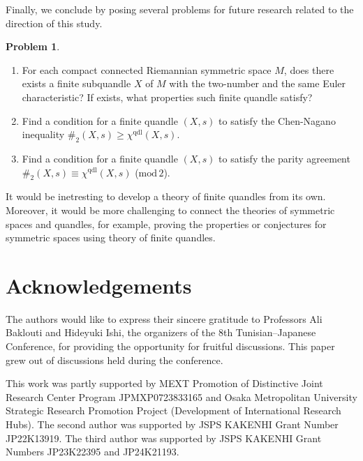 \documentclass[12pt]{amsart}
\theoremstyle{definition}
\newtheorem{Problem}[Prop]{Problem}
\begin{document}
Finally, we conclude by posing several problems for future research related to the direction of this study.

\begin{Problem} \noindent 
\begin{enumerate} 
\item 
For each compact connected Riemannian symmetric space $M$, 
does there exists a finite subquandle $X$ of $M$ with the two-number and the same Euler characteristic? 
If exists, what properties such finite quandle satisfy? 
\item 
Find a condition for a finite quandle $(X,s)$ to satisfy the Chen-Nagano inequality 
$\#_2 (X,s) \geq \chi^{\mathrm{qdl}} (X,s)$. 
\item
Find a condition for a finite quandle $(X,s)$ to satisfy the parity agreement 
$\#_2 (X,s) \equiv \chi^{\mathrm{qdl}} (X,s)$ ($\mathrm{mod}\, 2$). 
\end{enumerate} 
\end{Problem} 



It would be inetresting to develop a theory of finite quandles from its own. 
Moreover, it would be more challenging to connect the theories of symmetric spaces and quandles, 
for example, proving the properties or conjectures for symmetric spaces using theory of finite quandles. 

\section*{Acknowledgements}

The authors would like to express their sincere gratitude to Professors Ali Baklouti 
and Hideyuki Ishi, the organizers of the 8th Tunisian--Japanese Conference, 
for providing the opportunity for fruitful discussions. 
This paper grew out of discussions held during the conference. 

This work was partly supported by 
MEXT Promotion of Distinctive Joint Research Center Program JPMXP0723833165 
and Osaka Metropolitan University Strategic Research Promotion Project 
(Development of International Research Hubs). 
The second author was supported by JSPS KAKENHI Grant Number JP22K13919. 
The third author was supported by JSPS KAKENHI Grant Numbers JP23K22395 and JP24K21193. 
\end{document}
